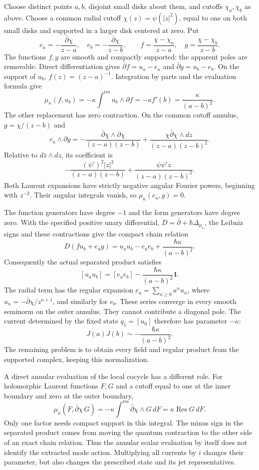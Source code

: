 Choose distinct points $a,b$, disjoint small disks about them, and
cutoffs $\chi_a,\chi_b$ as above.  Choose a common radial cutoff
$\chi(z)=\psi(|z|^2)$, equal to one on both small disks and supported
in a larger disk centered at zero.  Put
\[
 e_a=-\frac{\bar\partial\chi}{z-a},\quad
 e_b=-\frac{\bar\partial\chi}{z-b},\qquad
 f=\frac{\chi-\chi_a}{z-a},\quad
 g=\frac{\chi-\chi_b}{z-b}.
\]
The functions $f,g$ are smooth and compactly supported: the apparent
poles are removable.  Direct differentiation gives
$\bar\partial f=u_a-e_a$ and $\bar\partial g=u_b-e_b$.
On the support of $u_b$, $f(z)=(z-a)^{-1}$.  Integration by parts
and the evaluation formula give
\[
 \mu_\kappa(f,u_b)
 =-\kappa\int^{\mathrm{res}}u_b\wedge\partial f
 =-\kappa f'(b)=\frac{\kappa}{(a-b)^2}.
\]
The other replacement has zero contraction.  On the common cutoff
annulus, $g=\chi/(z-b)$ and
\[
 e_a\wedge\partial g
 =-\frac{\bar\partial\chi\wedge\partial\chi}{(z-a)(z-b)}
  +\frac{\chi\bar\partial\chi\wedge dz}{(z-a)(z-b)^2}.
\]
Relative to $d\bar z\wedge dz$, its coefficient is
\[
 -\frac{(\psi')^2|z|^2}{(z-a)(z-b)}
 +\frac{\psi\psi' z}{(z-a)(z-b)^2}.
\]
Both Laurent expansions have strictly negative angular Fourier powers,
beginning with $z^{-2}$.  Their angular integrals vanish, so
$\mu_\kappa(e_a,g)=0$.

The function generators have degree $-1$ and the form generators have
degree zero.  With the specified positive unary differential,
$D=\bar\partial+\hbar\Delta_{\mu_\kappa}$, the Leibniz signs and
these contractions give the compact chain relation
\[
 D(fu_b+e_ag)=u_au_b-e_ae_b+
                     \frac{\hbar\kappa}{(a-b)^2}.
\]
Consequently the actual separated product satisfies
\[
 [u_au_b]=[e_ae_b]-\frac{\hbar\kappa}{(a-b)^2}\mathbf1.
\]
The radial term has the regular expansion
$e_a=\sum_{n\ge0}a^nu_n$, where
$u_n=-\bar\partial\chi/z^{n+1}$, and similarly for $e_b$.
These series converge in every smooth seminorm on the outer annulus.
They cannot contribute a diagonal pole.  The current determined by
the fixed state $q_1=[u_0]$ therefore has parameter $-\kappa$:
\[
 J(a)J(b)\sim-\frac{\hbar\kappa}{(a-b)^2}.
\]
The remaining problem is to obtain every field and regular product
from the supported complex, keeping this normalization.

A direct annular evaluation of the local cocycle has a different
role.  For holomorphic Laurent functions $F,G$ and a cutoff equal to
one at the inner boundary and zero at the outer boundary,
\[
 \mu_\kappa(F,\bar\partial\chi\,G)
 =-\kappa\int^{\mathrm{res}}\bar\partial\chi\wedge G\,dF
 =\kappa\operatorname{Res}G\,dF.
\]
Only one factor needs compact support in this integral.  The minus
sign in the separated product comes from moving the quantum
contraction to the other side of an exact chain relation.  Thus the
annular scalar evaluation by itself does not identify the extracted
mode action.  Multiplying all currents by $i$ changes their parameter,
but also changes the prescribed state and its jet representatives.

